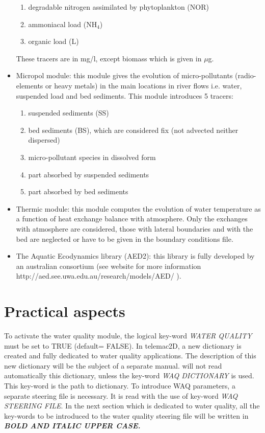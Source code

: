 \begin{itemize}
\begin{enumerate}
\item  degradable nitrogen assimilated by phytoplankton (NOR)

\item  ammoniacal load (NH${}_{4}$)

\item  organic load (L)
\end{enumerate}

     These tracers are in mg/l, except biomass which is given in $\mu$g.

\item  Micropol module:  this module gives the evolution of micro-pollutants (radio-elements or heavy metals) in the main locations in river flows i.e. water, suspended load and bed sediments. This module introduces 5 tracers:
\begin{enumerate}
\item  suspended sediments (SS)

\item  bed sediments (BS), which are considered fix (not advected neither dispersed)

\item  micro-pollutant species in dissolved form

\item  part absorbed by suspended sediments

\item  part absorbed by bed sediments
\end{enumerate}

\item  Thermic module: this module computes the evolution of water temperature as a function of heat exchange balance with atmosphere. Only the exchanges with atmosphere are considered, those with lateral boundaries and with the bed are neglected or have to be given in the boundary conditions file.
\item The Aquatic Ecodynamics library (AED2): this library is fully developed by an australian consortium (see website for more information http://aed.see.uwa.edu.au/research/models/AED/ ).
\end{itemize}


\section{ Practical aspects}



 To activate the water quality module, the logical key-word \textit{WATER QUALITY} must be set to TRUE (default= FALSE).  In telemac2D, a new dictionary is created and fully dedicated to water quality applications. The description of this new dictionary will be the subject of a separate manual.  will not read automatically this dictionary, unless the key-word \textit{WAQ DICTIONARY} is used. This key-word is the path to dictionary. To introduce WAQ parameters, a separate steering file is necessary. It is read with the use of key-word \textit{WAQ STEERING FILE}. In the next section which is dedicated to water quality, all the key-words to be introduced to the water quality steering file will be written in \textbf{\textit{BOLD AND ITALIC UPPER CASE.}}

